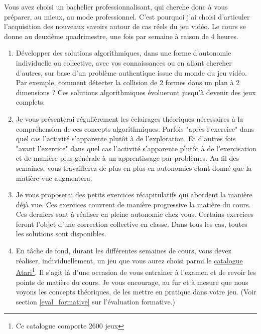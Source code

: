 Vous avez choisi un bachelier professionnalisant, qui cherche donc à vous préparer, au mieux, au mode professionnel. C’est  pourquoi j’ai choisi d’articuler l’acquisition des nouveaux savoirs autour de cas réels du jeu vidéo. Le cours se donne au deuxième quadrimestre, une fois par semaine à raison de 4 heures.
\begin{enumerate}
    \item Développer des solutions algorithmiques, dans une forme d’autonomie individuelle ou collective, avec vos connaissances ou en allant chercher d’autres, sur base d’un problème authentique issue du monde du jeu vidéo. Par exemple, comment détecter la collision de 2 formes dans un plan à 2 dimensions ? Ces solutions algorithmiques évolueront jusqu'à devenir des jeux complets.
    \item Je vous présenterai régulièrement les éclairages théoriques nécessaires à la compréhension de ces concepts algorithmiques. Parfois "après l’exercice" dans quel cas l’activité s’apparente plutôt à de l’exploration. Et d’autres fois "avant l’exercice" dans quel cas l’activité s’apparente plutôt à de l’exercisation et de manière plus générale à un apprentissage par problèmes. Au fil des semaines, vous travaillerez de plus en plus en autonomies étant donné que la matière vue augmentera.
    \item Je vous proposerai des petits exercices récapitulatifs qui abordent la manière déjà vue. Ces exercices couvrent de manière progressive la matière du cours. Ces derniers sont à réaliser en pleine autonomie chez vous. Certains exercices feront l'objet d'une correction collective en classe. Dans tous les cas, toutes les solutions sont disponibles.
    \item En tâche de fond, durant les différentes semaines de cours, vous devez réaliser, individuellement, un jeu que vous aurez choisi parmi le \href{https://fr.wikipedia.org/wiki/Liste_de_jeux_Atari_2600}{catalogue Atari}\footnote{Ce catalogue comporte 2600 jeux}. Il s’agit là d’une occasion de vous entrainer à l’examen et de revoir les points de matière du cours. Je vous encourage, au fur et à mesure que nous voyons les concepts théoriques, de les mettre en pratique dans votre jeu. (Voir section \ref{eval_formative} sur l'évaluation formative.)
\end{enumerate}

\clearpage
